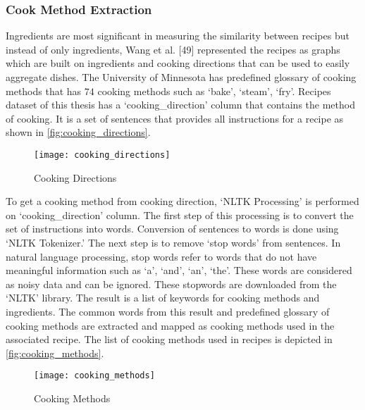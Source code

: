 \subsubsection{Cook Method Extraction}
\label{sec:cook_method}
Ingredients are most significant in measuring the similarity between recipes but instead of only ingredients, Wang et al. [49] represented the recipes as graphs which are built on ingredients and cooking directions that can be used to easily aggregate dishes. 
The University of Minnesota has predefined glossary of cooking methods \cite{50} that has $74$ cooking methods such as `bake', `steam', `fry'. Recipes dataset of this thesis has a `cooking\_direction' column that contains the method of cooking. It is a set of sentences that provides all instructions for a recipe as shown in \autoref{fig:cooking_directions}.
\begin{singlespace}
\begin{figure}[H]
	\centering
	\texttt{[image: cooking\_directions]}
	\caption{Cooking Directions }
	\label{fig:cooking_directions}
\end{figure}
\end{singlespace}

\noindent To get a cooking method from cooking direction, `NLTK Processing' is performed on `cooking\_direction' column.  The first step of this processing is to convert the set of instructions into words. Conversion of sentences to words is done using `NLTK Tokenizer.' The next step is to remove `stop words' from sentences. In natural language processing, stop words refer to words that do not have meaningful information such as `a', `and', `an', `the'. These words are considered as noisy data and can be ignored. These stopwords are downloaded from the `NLTK' library. The result is a list of keywords for cooking methods and ingredients. The common words from this result and predefined glossary of cooking methods are extracted and mapped as cooking methods used in the associated recipe. The list of cooking methods used in recipes is depicted in \autoref{fig:cooking_methods}.
\begin{singlespace}
\begin{figure}[H]
	\centering
	\texttt{[image: cooking\_methods]}
	\caption{Cooking Methods }
	\label{fig:cooking_methods}
\end{figure}  
\end{singlespace}

